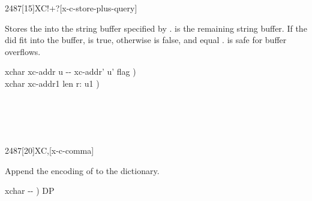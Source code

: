 \enlargethispage{8ex}\vspace*{-1ex}
\begin{worddef}[XC!+q]{2487}[15]{XC!+?}[x-c-store-plus-query]%
\item {}

	Stores the  into the string buffer specified by
	.   is the remaining string
	buffer.  If the  did fit into the buffer, 
	is true, otherwise  is false, and 
	equal .   is safe for buffer overflows.

	\begin{implement} %
	\word{:}   xchar xc-addr u -{}- xc-addr' u' flag ) \\
	\tab {}        xchar xc-addr1 len r: u1 ) \\
	\tab[2]   \\
	\tab[2]     \\
	\tab {} \\
	\tab[2]      \word{-}  \\
	\tab {} \word{;}
	\end{implement}

	\begin{testing} %
	\end{testing}
\end{worddef}

\vspace*{-1ex}
\begin{worddef}{2487}[20]{XC,}[x-c-comma]%
\item {}

	Append the encoding of  to the dictionary.


	\begin{implement} %
	\word{:}   xchar -{}- )   DP \word{!} \word{;}
	\end{implement}
\end{worddef}

